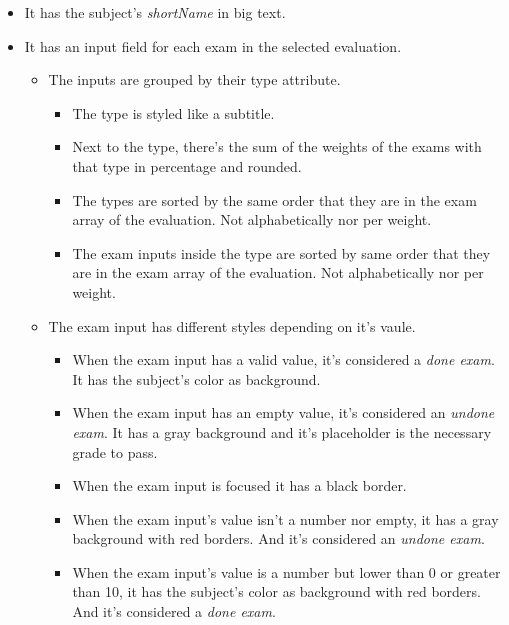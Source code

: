 \begin{itemize}[leftmargin=2cm]
\begin{itemize}[leftmargin=2cm]
    \end{itemize}
    \item[\nextTask{}\label{req:x}] It has the subject's \textit{shortName} in big text.
    \item[\nextTask{}\label{req:x}] It has an input field for each exam in the selected evaluation.
    \begin{itemize}[leftmargin=2cm]
        \item[\nextTask{}\label{req:x}] The inputs are grouped by their type attribute.
        \begin{itemize}[leftmargin=2cm]
            \item[\nextTask{}\label{req:x}] The type is styled like a subtitle.
            \item[\nextTask{}\label{req:x}] Next to the type, there's the sum of the weights of the exams with that type in percentage and rounded.
            \item[\nextTask{}\label{req:x}] The types are sorted by the same order that they are in the exam array of the evaluation. Not alphabetically nor per weight.
            \item[\nextTask{}\label{req:x}] The exam inputs inside the type are sorted by same order that they are in the exam array of the evaluation. Not alphabetically nor per weight.
        \end{itemize}
        \item[\nextTask{}\label{req:x}] The exam input has different styles depending on it's vaule.
        \begin{itemize}[leftmargin=2cm]
            \item[\nextTask{}\label{req:x}] When the exam input has a valid value, it's considered a \textit{done exam}. It has the subject's color as background.
            \item[\nextTask{}\label{req:x}] When the exam input has an empty value, it's considered an \textit{undone exam}. It has a gray background and it's placeholder is the necessary grade to pass.
            \item[\nextTask{}\label{req:x}] When the exam input is focused it has a black border.
            \item[\nextTask{}\label{req:x}] When the exam input's value isn't a number nor empty, it has a gray background with red borders. And it's considered an \textit{undone exam}.
            \item[\nextTask{}\label{req:x}] When the exam input's value is a number but lower than 0 or greater than 10, it has the subject's color as background with red borders. And it's considered a \textit{done exam}.

\end{itemize}
\end{itemize}
\end{itemize}
